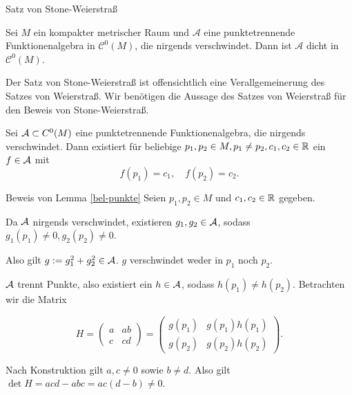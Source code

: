 \begin{frame}{Satz von Stone-Weierstraß}
    \begin{satz}
        Sei \(M\) ein kompakter metrischer Raum und \( \mathcal{A} \) eine punktetrennende
        Funktionenalgebra in \( \mathcal{C}^0(M) \), die nirgends verschwindet. 
        Dann ist \( \mathcal{A} \) dicht in \( \mathcal{C}^0(M) \).
    \end{satz}
    \pause
    \begin{bem}
        Der Satz von Stone-Weierstraß ist offensichtlich eine Verallgemeinerung 
        des Satzes von Weierstraß. 
        Wir benötigen die Aussage des Satzes von Weierstraß für den Beweis von Stone-Weierstraß.
    \end{bem}
\end{frame}

\begin{frame}
    \begin{lem}\label{bel-punkte}
        Sei \( \mathcal{A} \subset C^0(M) \) eine punktetrennende Funktionenalgebra, die nirgends verschwindet. 
        Dann existiert für beliebige \( p_1, p_2 \in M, p_1\neq p_2, 
        c_1, c_2 \in \mathbb{R} \)
        ein \(f \in \mathcal{A}\) mit 
        \[ f(p_1) = c_1, \quad f(p_2) = c_2. \]
    \end{lem}
\end{frame}

\begin{frame}{Beweis von Lemma \ref{bel-punkte}}
    Seien \( p_1, p_2 \in M \) und \( c_1, c_2 \in \mathbb{R} \) gegeben. 
    \pause

    Da \(\mathcal{A}\) nirgends verschwindet, existieren \( g_1, g_2 \in \mathcal{A} \), 
    sodass 
    \( g_1(p_1) \neq 0, g_2(p_2) \neq 0 \). 
    \pause

    Also gilt \( g := g_1^2 + g_2^2 \in \mathcal{A} \). \(g\) verschwindet weder in \(p_1\) noch \(p_2\).
    \pause 

    \(\mathcal{A}\) trennt Punkte, also existiert ein \( h \in \mathcal{A} \), sodass 
    \( h(p_1) \neq h(p_2) \).
    \pause 
    Betrachten wir die Matrix 

    \[ H = \begin{pmatrix}
        a & ab \\
        c & cd
    \end{pmatrix} = \begin{pmatrix}
        g(p_1) & g(p_1) h(p_1) \\
        g(p_2) & g(p_2) h(p_2)
    \end{pmatrix}. \]
    \pause

    Nach Konstruktion gilt 
    \( a, c \neq 0 \) sowie \(b \neq d\). Also gilt \( \det H = acd - abc = ac(d - b) \neq 0 \). 
\end{frame}

